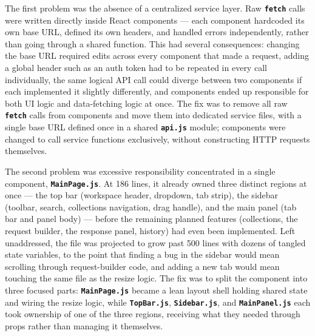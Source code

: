 The first problem was the absence of a centralized service layer. Raw \textbf{\texttt{fetch}} calls were written directly inside React components --- each component hardcoded its own base URL, defined its own headers, and handled errors independently, rather than going through a shared function. This had several consequences: changing the base URL required edits across every component that made a request, adding a global header such as an auth token had to be repeated in every call individually, the same logical API call could diverge between two components if each implemented it slightly differently, and components ended up responsible for both UI logic and data-fetching logic at once. The fix was to remove all raw \textbf{\texttt{fetch}} calls from components and move them into dedicated service files, with a single base URL defined once in a shared \textbf{\texttt{api.js}} module; components were changed to call service functions exclusively, without constructing HTTP requests themselves.

The second problem was excessive responsibility concentrated in a single component, \textbf{\texttt{MainPage.js}}. At 186 lines, it already owned three distinct regions at once --- the top bar (workspace header, dropdown, tab strip), the sidebar (toolbar, search, collections navigation, drag handle), and the main panel (tab bar and panel body) --- before the remaining planned features (collections, the request builder, the response panel, history) had even been implemented. Left unaddressed, the file was projected to grow past 500 lines with dozens of tangled state variables, to the point that finding a bug in the sidebar would mean scrolling through request-builder code, and adding a new tab would mean touching the same file as the resize logic. The fix was to split the component into three focused parts: \textbf{\texttt{MainPage.js}} became a lean layout shell holding shared state and wiring the resize logic, while \textbf{\texttt{TopBar.js}}, \textbf{\texttt{Sidebar.js}}, and \textbf{\texttt{MainPanel.js}} each took ownership of one of the three regions, receiving what they needed through props rather than managing it themselves.

